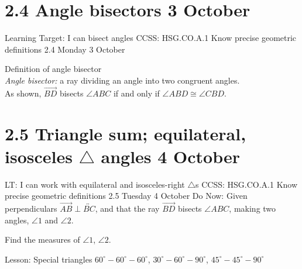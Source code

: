 \section{2.4 Angle bisectors \hfill 3 October}
\begin{frame}{Learning Target: I can bisect angles}
  {CCSS: HSG.CO.A.1 Know precise geometric definitions  \hfill \alert{2.4 Monday 3 October}}

  Definition of angle bisector\\
  \emph{Angle bisector:} a ray dividing an angle into two congruent angles.\\[0.5cm]
  As shown, $\overrightarrow{BD}$ bisects $\angle ABC$ if and only if $\angle ABD \cong \angle CBD$. 
  \begin{center}
    \end{center}
  \end{frame}


\section{2.5 Triangle sum; equilateral, isosceles $\triangle$ angles \hfill 4 October}
\begin{frame}{LT: I can work with equilateral and isosceles-right $\triangle$s}
  {CCSS: HSG.CO.A.1 Know precise geometric definitions  \hfill \alert{2.5 Tuesday 4 October}}
  Do Now: Given perpendiculars $\overrightarrow{AB} \perp \overleftrightarrow{BC}$, and that the ray $\overrightarrow{BD}$ bisects $\angle ABC$, making two angles, $\angle 1$ and $\angle 2$. \par \medskip
  Find the measures of $\angle 1$, $\angle 2$.
  \begin{flushleft}
    \end{flushleft}
    Lesson: Special triangles $60^\circ-60^\circ-60^\circ$, $30^\circ-60^\circ-90^\circ$, $45^\circ-45^\circ-90^\circ$
  \end{frame}

